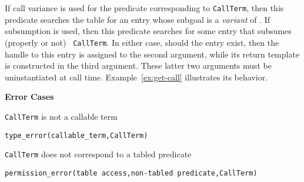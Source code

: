 \begin{description}
\begin{description}
%
  If call
variance is used for the predicate corresponding to {\tt CallTerm},
then this predicate searches the table for an entry whose subgoal is a
\emph{variant} of .  If subsumption is used, then this
predicate searches for some entry that subsumes (properly or not) {\tt
  CallTerm}.  In either case, should the entry exist, then the handle
to this entry is assigned to the second argument, while its return
template is constructed in the third argument.  These latter two
arguments must be uninstantiated at call time.
Example~\ref{ex:get-call} illustrates its behavior.

{\bf Error Cases}
\bi
\item {\tt CallTerm} is not a callable term
\bi
\item {\tt type\_error(callable\_term,CallTerm)}
\ei
\item {\tt CallTerm} does not correspond to a tabled predicate
\bi
\item 	{\tt permission\_error(table access,non-tabled predicate,{\tt CallTerm})}

\ei
\ei
\ \\
\begin{minipage}{6in}
\end{minipage}
\end{description}
\end{description}
